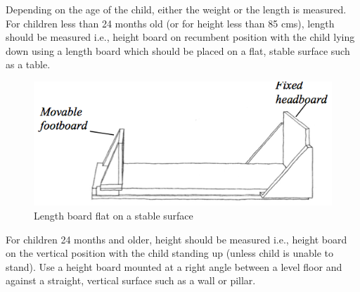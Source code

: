 \documentclass[12pt,]{book}
\theoremstyle{definition}
\theoremstyle{definition}
\theoremstyle{definition}
\theoremstyle{remark}
\begin{document}
Depending on the age of the child, either the weight or the length is
measured. For children less than 24 months old (or for height less than
85 cms), length should be measured i.e., height board on recumbent
position with the child lying down using a length board which should be
placed on a flat, stable surface such as a table.

\begin{figure}

{\centering \includegraphics[width=7.28in]{images/heightBoard03} 

}

\caption{Length board flat on a stable surface}\label{fig:height04}
\end{figure}

For children 24 months and older, height should be measured i.e., height
board on the vertical position with the child standing up (unless child
is unable to stand). Use a height board mounted at a right angle between
a level floor and against a straight, vertical surface such as a wall or
pillar.
\end{document}
